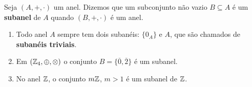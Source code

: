 \begin{definicao}
    Seja $(A, +, \cdot)$ um anel. Dizemos que um subconjunto n{\~a}o vazio $B\subseteq A$ {\'e} um \textbf{subanel} de $A$ quando $(B, +, \cdot)$ \'e um anel.
\end{definicao}

\begin{exemplos}
    \begin{enumerate}[label={\arabic*})]
        \item Todo anel $A$ sempre tem dois suban{\'e}is: $\{0_{A}\}$ e $A$, que s{\~a}o chamados de \textbf{suban{\'e}is triviais}.
        \item Em $(\mathbb{Z}_4,\oplus,\otimes)$ o conjunto $B = \{\overline{0}, \overline{2}\}$ \'e um subanel.
        \item No anel $\mathbb{Z}$, o conjunto $m\mathbb{Z}$, $m > 1$ {\'e} um subanel de $\mathbb{Z}$.
    \end{enumerate}
\end{exemplos}

